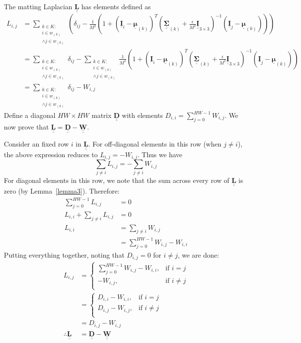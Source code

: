 \documentclass{article}
\theoremstyle{definition}
\def\vt#1{\underline{\mathbf{#1}}}
\def\vts#1{\underline{\boldsymbol{#1}}}
\def\mt#1{\underline{\underline{\mathbf{#1}}}}
\def\mts#1{\underline{\underline{\boldsymbol{#1}}}}
\begin{document}
The matting Laplacian $\mt L$ has elements defined as
\begin{align*}
    L_{i,j} &= \sum_{\substack{k\in K:\\i\in w_{(k)}\\ \wedge j\in w_{(k)}}} \left( \delta_{ij} - \frac1{M^2}\left(1 + \left(\vt{I}_i - \vts \mu_{(k)}\right)^T \left(\mts \Sigma_{(k)} + \frac\epsilon{M^2} \mt{I}_{3\times 3}\right)^{-1} \left(\vt{I}_j - \vts
\mu_{(k)}\right) \right) \right) \\
    &= \sum_{\substack{k\in K:\\i\in w_{(k)}\\ \wedge j\in w_{(k)}}} \delta_{ij} - \sum_{\substack{k\in K:\\i\in w_{(k)} \\\wedge j\in w_{(k)}}} \frac1{M^2} \left(1 + \left(\vt{I}_i - \vts \mu_{(k)}\right)^T \left(\mts \Sigma_{(k)} + \frac\epsilon{M^2} \mt{I}_{3\times 3}\right)^{-1} \left(\vt{I}_j - \vts
    \mu_{(k)}\right) \right) \\
    &= \sum_{\substack{k\in K:\\i\in w_{(k)} \\\wedge j\in w_{(k)}}} \delta_{ij} -  W_{i,j}
\end{align*}
Define a diagonal $HW\times HW$ matrix $\mt D$ with elements $D_{i,i} = \sum_{j=0}^{HW-1} W_{i,j}$. We now prove that $\mt L = \mt D - \mt W$.

Consider an fixed row $i$ in $\mt L$. For off-diagonal elements in this row (when $j\neq i$), the above expression reduces to $L_{i,j} = -W_{i,j}$. Thus we have
$$\sum_{j\neq i} L_{i,j} = -\sum_{j\neq i} W_{i,j}$$
For diagonal elements in this row, we note that the sum across every row of $\mt L$ is zero (by Lemma~\ref{lemma3}). Therefore:
\begin{align*}
    \sum_{j=0}^{HW-1} L_{i,j} &= 0\\
    L_{i,i} + \sum_{j\neq i} L_{i,j} &= 0\\
    L_{i,i} &= \sum_{j\neq i} W_{i,j}\\
    &= \sum_{j=0}^{HW-1} W_{i,j} - W_{i,i}
\end{align*}
Putting everything together, noting that $D_{i,j}=0$ for $i\neq j$, we are done:
\begin{align*}
    L_{i,j} &= \begin{cases}
        \sum_{j=0}^{HW-1} W_{i,j} - W_{i,i},&\text{if $i=j$}\\
        - W_{i,j},&\text{if $i\neq j$}\\
    \end{cases} \\
    &= \begin{cases}
        D_{i,i} - W_{i,i},&\text{if $i=j$}\\
        D_{i,j} - W_{i,j},&\text{if $i\neq j$}\\
    \end{cases}\\
    &= D_{i,j} - W_{i,j}\\
    \therefore \mt L &= \mt D - \mt W
\end{align*}
\end{document}

